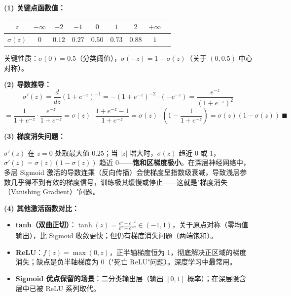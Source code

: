 \documentclass[a4paper,11pt]{ctexart}
\begin{document}
\begin{solutionbox}[参考答案与详细解析]
    \textbf{(1) 关键点函数值：}

    \begin{center}
    \begin{tabular}{ccccccccc}
        \toprule
        $z$ & $-\infty$ & $-2$ & $-1$ & $0$ & $1$ & $2$ & $+\infty$ \\
        \midrule
        $\sigma(z)$ & $0$ & $0.12$ & $0.27$ & $0.50$ & $0.73$ & $0.88$ & $1$ \\
        \bottomrule
    \end{tabular}
    \end{center}
    关键性质：$\sigma(0)=0.5$（分类阈值），$\sigma(-z)=1-\sigma(z)$（关于 $(0,0.5)$ 中心对称）。

    \textbf{(2) 导数推导：}
    \[
    \sigma'(z) = \frac{d}{dz}(1+e^{-z})^{-1} = -(1+e^{-z})^{-2}\cdot(-e^{-z}) = \frac{e^{-z}}{(1+e^{-z})^2}
    \]
    \[
    = \frac{1}{1+e^{-z}}\cdot\frac{e^{-z}}{1+e^{-z}} = \sigma(z)\cdot\frac{1+e^{-z}-1}{1+e^{-z}} = \sigma(z)\cdot\left(1-\frac{1}{1+e^{-z}}\right) = \sigma(z)(1-\sigma(z))\ \blacksquare
    \]

    \textbf{(3) 梯度消失问题：}

    $\sigma'(z)$ 在 $z=0$ 处取最大值 $0.25$；当 $|z|$ 增大时，$\sigma(z)$ 趋近 0 或 1，$\sigma'(z)=\sigma(z)(1-\sigma(z))$ 趋近 0——\textbf{饱和区梯度极小}。在深层神经网络中，多层 Sigmoid 激活的导数连乘（反向传播）会使梯度呈指数级衰减，导致浅层参数几乎得不到有效的梯度信号，训练极其缓慢或停止——这就是"梯度消失（Vanishing Gradient）"问题。

    \textbf{(4) 其他激活函数对比：}
    \begin{itemize}
        \item \textbf{tanh（双曲正切）}：$\tanh(z)=\frac{e^z-e^{-z}}{e^z+e^{-z}}\in(-1,1)$，关于原点对称（零均值输出），比 Sigmoid 收敛更快；但仍有梯度消失问题（两端饱和）。
        \item \textbf{ReLU}：$f(z)=\max(0,z)$，正半轴梯度恒为 1，彻底解决正区域的梯度消失；缺点是负半轴梯度为 0（"死亡 ReLU"问题）。深度学习中最常用。
        \item \textbf{Sigmoid 优点保留的场景}：二分类输出层（输出 $[0,1]$ 概率）；在深层隐含层中已被 ReLU 系列取代。
    \end{itemize}
\end{solutionbox}
\end{document}
